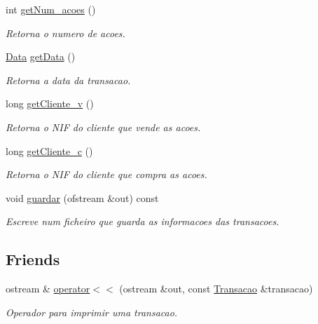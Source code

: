 \begin{DoxyCompactItemize}
int \hyperlink{class_transacao_af52a47c91fe23258ddd212a78f044297}{get\+Num\+\_\+acoes} ()
\begin{DoxyCompactList}\small\item\em Retorna o numero de acoes. \end{DoxyCompactList}\item 
\hyperlink{class_data}{Data} \hyperlink{class_transacao_a94162db1ef8a17eee755c3a3c1d7744b}{get\+Data} ()
\begin{DoxyCompactList}\small\item\em Retorna a data da transacao. \end{DoxyCompactList}\item 
long \hyperlink{class_transacao_a67521a6dea9a82ca2d7d3821a10a6e0d}{get\+Cliente\+\_\+v} ()
\begin{DoxyCompactList}\small\item\em Retorna o N\+IF do cliente que vende as acoes. \end{DoxyCompactList}\item 
long \hyperlink{class_transacao_ad896abaa081d1407b69f8bd9a60b107c}{get\+Cliente\+\_\+c} ()
\begin{DoxyCompactList}\small\item\em Retorna o N\+IF do cliente que compra as acoes. \end{DoxyCompactList}\item 
void \hyperlink{class_transacao_aa4b2e7563ee4cb46bea35ea5b8d5f96a}{guardar} (ofstream \&out) const
\begin{DoxyCompactList}\small\item\em Escreve num ficheiro que guarda as informacoes das transacoes. \end{DoxyCompactList}\end{DoxyCompactItemize}
\subsection*{Friends}
\begin{DoxyCompactItemize}
\item 
ostream \& \hyperlink{class_transacao_a1b84445ef2674a7af30a1d313844766c}{operator$<$$<$} (ostream \&out, const \hyperlink{class_transacao}{Transacao} \&transacao)
\begin{DoxyCompactList}\small\item\em Operador para imprimir uma transacao. \end{DoxyCompactList}\end{DoxyCompactItemize}


